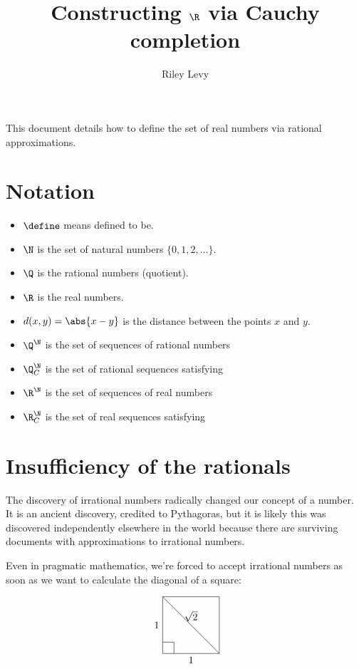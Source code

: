 \documentclass{scrartcl}
\newcommand{\dist}{d}
\begin{document}
\title{Constructing $\R$ via Cauchy completion}
\author{Riley Levy}
\maketitle{}
This document details how to define the set of real numbers via rational approximations.
\section{Notation}
\begin{itemize}
  \item $\define$ means defined to be.
  \item \(\N\) is the set of natural numbers $\{0,1,2,\dots\}$.
  \item \(\Q\) is the rational numbers (quotient).
  \item \(\R\) is the real numbers.
  \item $\dist(x,y)=\abs{x-y}$ is the distance between the points $x$ and $y$.
  \item \(\Q^{\N}\) is the set of sequences of rational numbers
  \item \(\Q^{\N}_{C}\) is the set of rational sequences satisfying 
  \item \(\R^{\N}\) is the set of sequences of real numbers
  \item \(\R^{\N}_{C}\) is the set of real sequences satisfying 
\end{itemize}
\section{Insufficiency of the rationals}
The discovery of irrational numbers radically changed our concept of a number. It is an ancient discovery, credited to Pythagoras, but it is likely this was discovered independently elsewhere in the world because there are surviving documents with approximations to irrational numbers.

Even in pragmatic mathematics, we're forced to accept irrational numbers as soon as we want to calculate the diagonal of a square:

\[
\begin{tikzpicture}[scale=2]
  \draw (0,0) -- node[below]{\(1\)} ++ (1,0);
  \draw (0,0) -- node[left]{\(1\)} ++ (0,1);
  \draw (1,0) -- node[above]{\(\sqrt2\)} (0,1);
  \draw (0,.2) -- (.2,.2) -- (.2,0);
  \draw (1,0) -- (1,1);
  \draw (0,1) -- (1,1);
\end{tikzpicture}
\]
\end{document}
